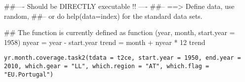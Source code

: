 \documentclass[letterpaper]{book}
\begin{document}
%
\begin{Arguments}
\begin{ldescription}
\item[\code{year}] 


\item[\code{month}] 


\item[\code{start.year}] 


\end{ldescription}
\end{Arguments}
%
\begin{Examples}
\begin{ExampleCode}
##---- Should be DIRECTLY executable !! ----
##-- ==>  Define data, use random,
##--	or do  help(data=index)  for the standard data sets.

## The function is currently defined as
function (year, month, start.year = 1958) 
{
    nyear = year - start.year
    trend = month + nyear * 12
    trend
  }
\end{ExampleCode}
\end{Examples}
%
\begin{Usage}
\begin{verbatim}
yr.month.coverage.task2(tdata = t2ce, start.year = 1950, end.year = 2010, which.gear = "LL", which.region = "AT", which.flag = "EU.Portugal")
\end{verbatim}
\end{Usage}
%
\begin{Arguments}
\begin{ldescription}
\item[\code{tdata}] 


\item[\code{start.year}] 


\item[\code{end.year}] 


\item[\code{which.gear}] 


\item[\code{which.region}] 


\item[\code{which.flag}] 


\end{ldescription}
\end{Arguments}
\end{document}
